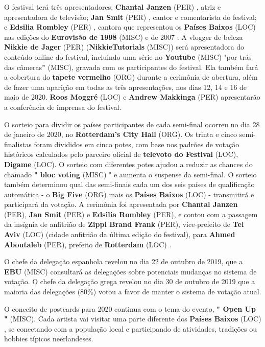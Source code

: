 \documentclass[12pt,a4paper]{article}
\begin{document}
O festival terá três apresentadores: \textbf{Chantal Janzen} (PER) , atriz e apresentadora de televisão; \textbf{Jan Smit} (PER) , cantor e comentarista do festival; e \textbf{Edsilia Rombley} (PER) , cantora que representou os \textbf{Países Baixos} (LOC) nas edições do \textbf{Eurovisão de 1998} (MISC) e de 2007 . A vlogger de beleza \textbf{Nikkie de Jager} (PER) (\textbf{NikkieTutorials} (MISC)) será apresentadora do conteúdo online do festival, incluindo uma série no \textbf{Youtube} (MISC) "por trás das câmeras\textbf{"} (MISC), gravada com os participantes do festival. Ela também fará a cobertura do \textbf{tapete vermelho} (ORG) durante a cerimônia de abertura, além de fazer uma aparição em todas as três apresentações, nos dias 12, 14 e 16 de maio de 2020. \textbf{Roos Moggré} (LOC) e \textbf{Andrew Makkinga} (PER) apresentarão a conferência de imprensa do festival.

O sorteio para dividir os países participantes de cada semi-final ocorreu no dia 28 de janeiro de 2020, no \textbf{Rotterdam's City Hall} (ORG). Os trinta e cinco semi-finalistas foram divididos em cinco potes, com base nos padrões de votação históricos calculados pelo parceiro oficial de \textbf{televoto do Festival} (LOC), \textbf{Digame} (LOC). O sorteio com diferentes potes ajudou a reduzir as chances do chamado \textbf{" bloc voting} (MISC) " e aumenta o suspense da semi-final. O sorteio também determinou qual das semi-finais cada um dos seis países de qualificação automática - o \textbf{Big Five} (ORG) mais os \textbf{Países Baixos} (LOC) - transmitirá e participará da votação. A cerimônia foi apresentada por \textbf{Chantal Janzen} (PER), \textbf{Jan Smit} (PER) e \textbf{Edsilia Rombley} (PER), e contou com a passagem da insígnia de anfitrião de \textbf{Zippi Brand Frank} (PER), vice-prefeito de \textbf{Tel Aviv} (LOC) (cidade anfitrião da última edição do festival), para \textbf{Ahmed Aboutaleb} (PER), prefeito de \textbf{Rotterdam} (LOC) .

O chefe da delegação espanhola revelou no dia 22 de outubro de 2019, que a \textbf{EBU} (MISC) consultará as delegações sobre potenciais mudanças no sistema de votação. O chefe da delegação grega revelou no dia 30 de outubro de 2019 que a maioria das delegações (80\%) votou a favor de manter o sistema de votação atual.

O conceito de postcards para 2020 continua com o tema do evento, \textbf{" Open Up "} (MISC). Cada artista vai visitar uma parte diferente dos \textbf{Países Baixos} (LOC) , se conectando com a população local e participando de atividades, tradições ou hobbies típicos neerlandeses.
\end{document}
